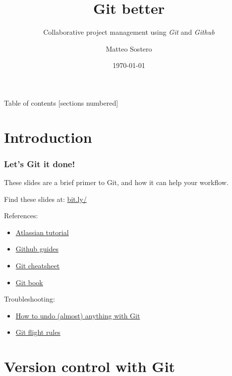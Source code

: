 \documentclass[10pt,svgnames,handout]{beamer}
\title{Git better}
\subtitle{Collaborative project management using \emph{Git} and \emph{Github}}
\date{\today}
\author{Matteo Sostero}
\institute{Sant'Anna School of Advanced Studies}
\begin{document}
\maketitle

\begin{frame}{Table of contents}
[sections numbered]
\tableofcontents[hideallsubsections]
\end{frame}

\section{Introduction}

\begin{frame}
\frametitle{Let's Git it done!}
    
These slides are a brief primer to Git, and how it can help your workflow.

\bigskip

\centerline{Find these slides at: \url{bit.ly/}}

\bigskip
\pause

References:
\begin{itemize}
  \item \href{https://www.atlassian.com/git/tutorials}{Atlassian tutorial}
  \item \href{https://guides.github.com/}{Github guides}
  \item \href{http://ndpsoftware.com/git-cheatsheet.html}{Git cheatsheet}
  \item \href{https://git-scm.com/book/en/v2}{Git book}
\end{itemize}
\medskip

Troubleshooting:
\begin{itemize}
  \item \href{https://github.com/blog/2019-how-to-undo-almost-anything-with-git}{How to undo (almost) anything with Git}
  \item \href{https://github.com/k88hudson/git-flight-rules/blob/master/README.md}{Git flight rules}
\end{itemize}
\end{frame}



\section{Version control with Git}
\end{document}
